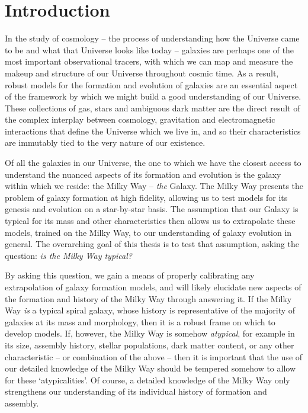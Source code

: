 \chapter{Introduction}
In the study of cosmology -- the process of understanding how the Universe came to be and what that Universe looks like today -- galaxies are perhaps one of the most important observational tracers, with which we can map and measure the makeup and structure of our Universe throughout cosmic time. As a result, robust models for the formation and evolution of galaxies are an essential aspect of the framework by which we might build a good understanding of our Universe. These collections of gas, stars and ambiguous dark matter are the direct result of the complex interplay between cosmology, gravitation and electromagnetic interactions that define the Universe which we live in, and so their characteristics are immutably tied to the very nature of our existence.

Of all the galaxies in our Universe, the one to which we have the closest access to understand the nuanced aspects of its formation and evolution is the galaxy within which we reside: the Milky Way -- \emph{the} Galaxy. The Milky Way presents the problem of galaxy formation at high fidelity, allowing us to test models for its genesis and evolution on a star-by-star basis. The assumption that our Galaxy is typical for its mass and other characteristics then allows us to extrapolate these models, trained on the Milky Way, to our understanding of galaxy evolution in general. The overarching goal of this thesis is to test that assumption, asking the question: \emph{is the Milky Way typical?}

By asking this question, we gain a means of properly calibrating any extrapolation of galaxy formation models, and will likely elucidate new aspects of the formation and history of the Milky Way through answering it. If the Milky Way \emph{is} a typical spiral galaxy, whose history is representative of the majority of galaxies at its mass and morphology, then it is a robust frame on which to develop models. If, however, the Milky Way is somehow \emph{atypical}, for example in its size, assembly history, stellar populations, dark matter content, or any other characteristic --  or combination of the above -- then it is important that the use of our detailed knowledge of the Milky Way should be tempered somehow to allow for these `atypicalities'. Of course, a detailed knowledge of the Milky Way only strengthens our understanding of its individual history of formation and assembly.

